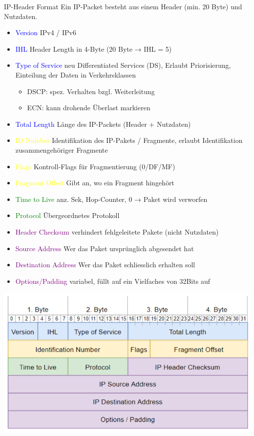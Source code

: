 \begin{KR}{IP-Header Format}
    Ein IP-Packet besteht aus einem Header (min. 20 Byte) und Nutzdaten.
    \begin{itemize}
        \item \textcolor{blue}{Version} IPv4 / IPv6
        \item \textcolor{blue}{IHL} Header Length in 4-Byte (20 Byte → IHL = 5)
        \item \textcolor{blue}{Type of Service} neu Differentiated Services (DS), Erlaubt Priorisierung, Einteilung der Daten in Verkehrsklassen
        \begin{itemize}
            \item DSCP: spez. Verhalten bzgl. Weiterleitung
            \item ECN: kann drohende Überlast markieren
        \end{itemize}
        \item \textcolor{blue}{Total Length} Länge des IP-Packets (Header + Nutzdaten)
        \item \textcolor{yellow}{ID Number} Identifikation des IP-Pakets / Fragmente, erlaubt Identifikation zusammengehöriger Fragmente
        \item \textcolor{yellow}{Flags} Kontroll-Flags für Fragmentierung (0/DF/MF)
        \item \textcolor{yellow}{Fragment Offset} Gibt an, wo ein Fragment hingehört
        \item \textcolor{green}{Time to Live} anz. Sek, Hop-Counter, 0 → Paket wird verworfen
        \item \textcolor{green}{Protocol} Übergeordnetes Protokoll
        \item \textcolor{purple}{Header Checksum} verhindert fehlgeleitete Pakete (nicht Nutzdaten)
        \item \textcolor{purple}{Source Address} Wer das Paket ursprünglich abgesendet hat
        \item \textcolor{purple}{Destination Address} Wer das Paket schliesslich erhalten soll
        \item \textcolor{purple}{Options/Padding} variabel, füllt auf ein Vielfaches von 32Bits auf
    \end{itemize}
        \includegraphics[width=1\linewidth]{images/internet_protokoll_format_ip.png}\\

\end{KR}
